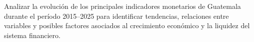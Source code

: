 Analizar la evolución de los principales indicadores monetarios de Guatemala durante el período 2015–2025 para identificar tendencias, relaciones entre variables y posibles factores asociados al crecimiento económico y la liquidez del sistema financiero.